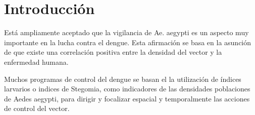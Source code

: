 \section{Introducción}
\label{sec:densidad-vectorial-introduccion}

Está ampliamente aceptado que la vigilancia de Ae. aegypti es un aspecto
muy importante en la lucha contra el dengue. Esta afirmación se basa en
la asunción de que existe una correlación positiva entre la densidad del
vector y la enfermedad humana\cite{dengueUruguayCap2}.

Muchos programas de control del dengue se basan el la utilización de
índices larvarios o indices de Stegomia, como indicadores de las densidades
poblaciones de Aedes aegypti, para dirigir y focalizar espacial y temporalmente
las acciones de control del vector.

